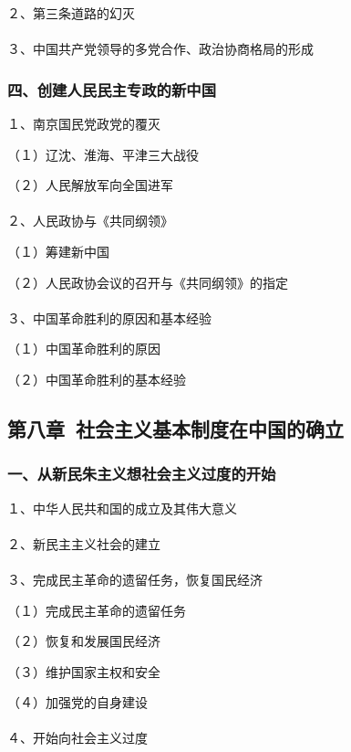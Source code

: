 \documentclass{ctexart}
\begin{document}
２、第三条道路的幻灭
\\\\

３、中国共产党领导的多党合作、政治协商格局的形成

\subsubsection{四、创建人民民主专政的新中国}

１、南京国民党政党的覆灭

（１）辽沈、淮海、平津三大战役

（２）人民解放军向全国进军
\\\\

２、人民政协与《共同纲领》

（１）筹建新中国

（２）人民政协会议的召开与《共同纲领》的指定
\\\\

３、中国革命胜利的原因和基本经验

（１）中国革命胜利的原因

（２）中国革命胜利的基本经验



\subsection{第八章\ 社会主义基本制度在中国的确立}

\subsubsection{一、从新民朱主义想社会主义过度的开始}

１、中华人民共和国的成立及其伟大意义
\\\\

２、新民主主义社会的建立
\\\\

３、完成民主革命的遗留任务，恢复国民经济

（１）完成民主革命的遗留任务

（２）恢复和发展国民经济

（３）维护国家主权和安全

（４）加强党的自身建设
\\\\

４、开始向社会主义过度
\end{document}
